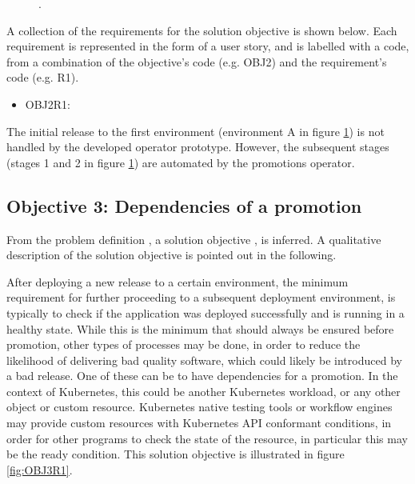 \begin{figure}[h]
	\centering
	\caption{.
	}
	\label{fig:OBJ2R1}	
\end{figure}

A collection of the requirements for the solution objective is shown below.
Each requirement is represented in the form of a user story,
and is labelled with a code, from a combination of the
objective's code (e.g. OBJ2) and the requirement's code (e.g. R1).

\begin{itemize}
	\item OBJ2R1: 
\end{itemize}

The initial release to the first environment (environment A in figure \ref{fig:OBJ2R1})
is not handled by the developed operator prototype.
However, the subsequent stages (stages 1 and 2 in figure \ref{fig:OBJ2R1})
are automated by the promotions operator.

\subsection{Objective 3: Dependencies of a promotion}
\label{objective3}

From the problem definition
\textit{},
a solution objective
\textit{},
is inferred.
A qualitative description of the solution objective
is pointed out in the following.

After deploying a new release to a certain environment,
the minimum requirement for further proceeding to a subsequent deployment environment,
is typically to check if the application was deployed successfully and is running in a healthy state.
While this is the minimum that should always be ensured before promotion,
other types of processes may be done, in order to reduce the likelihood of delivering bad quality software,
which could likely be introduced by a bad release.
One of these can be to have dependencies for a promotion.
In the context of Kubernetes, this could be another Kubernetes workload, or any other object or custom resource.
Kubernetes native testing tools or workflow engines may provide custom resources with Kubernetes API conformant
conditions, in order for other programs to check the state of the resource, in particular this may be the ready condition.
This solution objective is illustrated in figure \ref{fig:OBJ3R1}.

